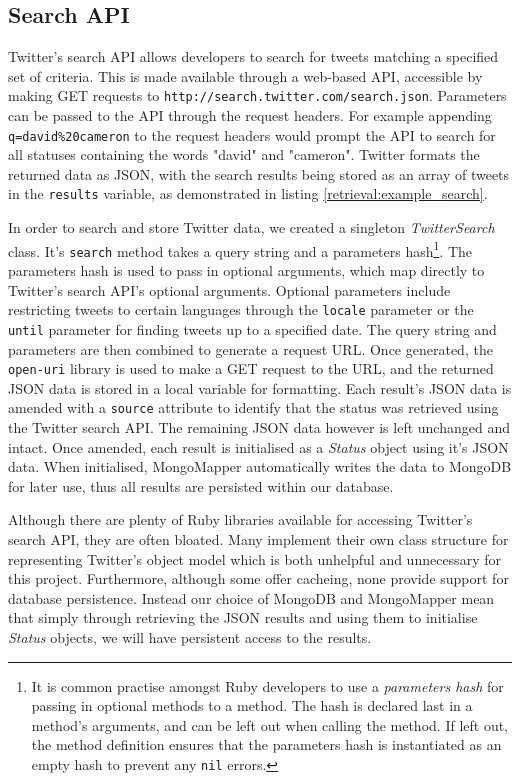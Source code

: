 \subsection{Search API}

Twitter's search API allows developers to search for tweets matching a specified set of criteria. This is made available through a web-based API, accessible by making GET requests to \texttt{http://\-search\-.\-twitter\-.\-com\-/\-search\-.\-json}. Parameters can be passed to the API through the request headers. For example appending \texttt{q=\-david\-\%20cameron} to the request headers would prompt the API to search for all statuses containing the words "david" and "cameron". Twitter formats the returned data as JSON, with the search results being stored as an array of tweets in the \texttt{results} variable, as demonstrated in listing \ref{retrieval:example_search}.

In order to search and store Twitter data, we created a singleton \emph{TwitterSearch} class. It's \texttt{search} method takes a query string and a parameters hash\footnote{It is common practise amongst Ruby developers to use a \emph{parameters hash} for passing in optional methods to a method. The hash is declared last in a method's arguments, and can be left out when calling the method. If left out, the method definition ensures that the parameters hash is instantiated as an empty hash to prevent any \texttt{nil} errors.}. The parameters hash is used to pass in optional arguments, which map directly to Twitter's search API's optional arguments. Optional parameters include restricting tweets to certain languages through the \texttt{locale} parameter or the \texttt{until} parameter for finding tweets up to a specified date. The query string and parameters are then combined to generate a request URL. Once generated, the \texttt{open-uri} library is used to make a GET request to the URL, and the returned JSON data is stored in a local variable for formatting. Each result's JSON data is amended with a \texttt{source} attribute to identify that the status was retrieved using the Twitter search API. The remaining JSON data however is left unchanged and intact. Once amended, each result is initialised as a \emph{Status} object using it's JSON data. When initialised, MongoMapper automatically writes the data to MongoDB for later use, thus all results are persisted within our database.

Although there are plenty of Ruby libraries available for accessing Twitter's search API, they are often bloated. Many implement their own class structure for representing Twitter's object model which is both unhelpful and unnecessary for this project. Furthermore, although some offer cacheing, none provide support for database persistence. Instead our choice of MongoDB and MongoMapper mean that simply through retrieving the JSON results and using them to initialise \emph{Status} objects, we will have persistent access to the results. 

